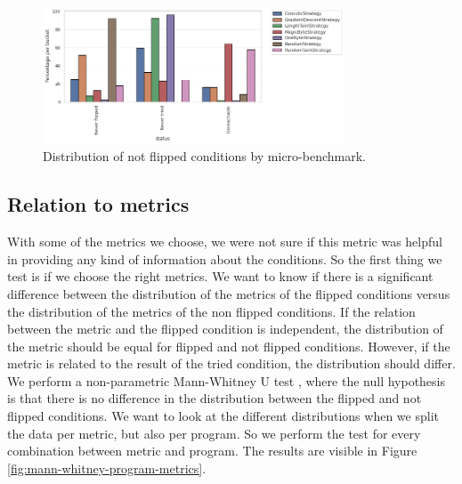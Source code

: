 \begin{figure}[H]
    \centering
    \includegraphics[width=0.8\textwidth]{5_results/graphs_new/benchmarks.png}  
    \caption{Distribution of not flipped conditions by micro-benchmark.}
    \label{fig:benchmarks}
\end{figure}

\subsection{Relation to metrics}
With some of the metrics we choose, we were not sure if this metric was helpful in providing any kind of information about the conditions. So the first thing we test is if we choose the right metrics. We want to know if there is a significant difference between the distribution of the metrics of the flipped conditions versus the distribution of the metrics of the non flipped conditions. If the relation between the metric and the flipped condition is independent, the distribution of the metric should be equal for flipped and not flipped conditions. However, if the metric is related to the result of the tried condition, the distribution should differ.
We perform a non-parametric Mann-Whitney U test \cite{metzman2020fuzzbench}, where the null hypothesis is that there is no difference in the distribution between the flipped and not flipped conditions. We want to look at the different distributions when we split the data per metric, but also per program. So we perform the test for every combination between metric and program. The results are visible in Figure \ref{fig:mann-whitney-program-metrics}.


